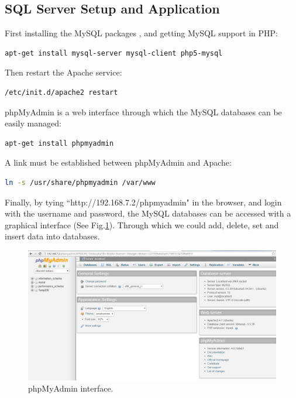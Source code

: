 \documentclass[12pt,journal,draftclsnofoot,onecolumn]{IEEEtran}
\begin{document}
\subsection{SQL Server Setup and Application}\label{Sql}
First installing the MySQL packages , and getting MySQL support in PHP:
\begin{lstlisting}[language={bash}]
apt-get install mysql-server mysql-client php5-mysql
\end{lstlisting}
Then restart the Apache service:
\begin{lstlisting}[language={bash}]
/etc/init.d/apache2 restart
\end{lstlisting}
phpMyAdmin is a web interface through which the MySQL databases can be easily managed: 
\begin{lstlisting}[language={bash}]
apt-get install phpmyadmin
\end{lstlisting}
A link must be established between phpMyAdmin and Apache:
\begin{lstlisting}[language={bash}]
ln -s /usr/share/phpmyadmin /var/www
\end{lstlisting}
Finally, by tying ``http://192.168.7.2/phpmyadmin" in the browser, and login with the username and password, the MySQL databases can be accessed with a graphical interface (See Fig.\ref{sql1}). Through which we could add, delete, set and insert data into databases.
\begin{figure}[ht]
	\centering
	\includegraphics[width=5in]{./figs/sql1.jpg}
	\caption{phpMyAdmin interface.}
	\label{sql1}
\end{figure}
\end{document}
